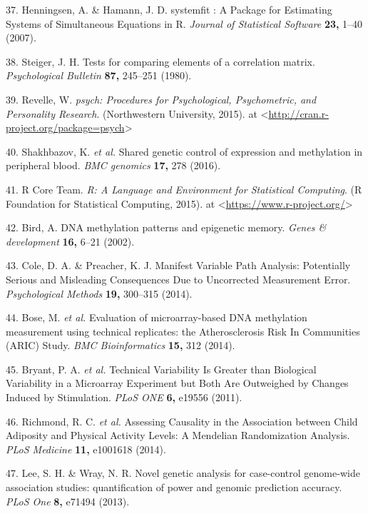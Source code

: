 \documentclass[]{article}
\begin{document}
\hypertarget{ref-Henningsen2007}{}
37. Henningsen, A. \& Hamann, J. D. systemfit : A Package for Estimating
Systems of Simultaneous Equations in R. \emph{Journal of Statistical
Software} \textbf{23,} 1--40 (2007).

\hypertarget{ref-Steiger1980}{}
38. Steiger, J. H. Tests for comparing elements of a correlation matrix.
\emph{Psychological Bulletin} \textbf{87,} 245--251 (1980).

\hypertarget{ref-Revelle2015}{}
39. Revelle, W. \emph{psych: Procedures for Psychological, Psychometric,
and Personality Research}. (Northwestern University, 2015). at
\textless{}\url{http://cran.r-project.org/package=psych}\textgreater{}

\hypertarget{ref-Shakhbazov2016}{}
40. Shakhbazov, K. \emph{et al.} Shared genetic control of expression
and methylation in peripheral blood. \emph{BMC genomics} \textbf{17,}
278 (2016).

\hypertarget{ref-RCoreTeam2015}{}
41. R Core Team. \emph{R: A Language and Environment for Statistical
Computing}. (R Foundation for Statistical Computing, 2015). at
\textless{}\url{https://www.r-project.org/}\textgreater{}

\hypertarget{ref-Bird2002}{}
42. Bird, A. DNA methylation patterns and epigenetic memory. \emph{Genes
\& development} \textbf{16,} 6--21 (2002).

\hypertarget{ref-Cole2014}{}
43. Cole, D. A. \& Preacher, K. J. Manifest Variable Path Analysis:
Potentially Serious and Misleading Consequences Due to Uncorrected
Measurement Error. \emph{Psychological Methods} \textbf{19,} 300--315
(2014).

\hypertarget{ref-Bose2014}{}
44. Bose, M. \emph{et al.} Evaluation of microarray-based DNA
methylation measurement using technical replicates: the Atherosclerosis
Risk In Communities (ARIC) Study. \emph{BMC Bioinformatics} \textbf{15,}
312 (2014).

\hypertarget{ref-Bryant2011}{}
45. Bryant, P. A. \emph{et al.} Technical Variability Is Greater than
Biological Variability in a Microarray Experiment but Both Are
Outweighed by Changes Induced by Stimulation. \emph{PLoS ONE}
\textbf{6,} e19556 (2011).

\hypertarget{ref-Richmond2014}{}
46. Richmond, R. C. \emph{et al.} Assessing Causality in the Association
between Child Adiposity and Physical Activity Levels: A Mendelian
Randomization Analysis. \emph{PLoS Medicine} \textbf{11,} e1001618
(2014).

\hypertarget{ref-Lee2013c}{}
47. Lee, S. H. \& Wray, N. R. Novel genetic analysis for case-control
genome-wide association studies: quantification of power and genomic
prediction accuracy. \emph{PLoS One} \textbf{8,} e71494 (2013).
\end{document}
